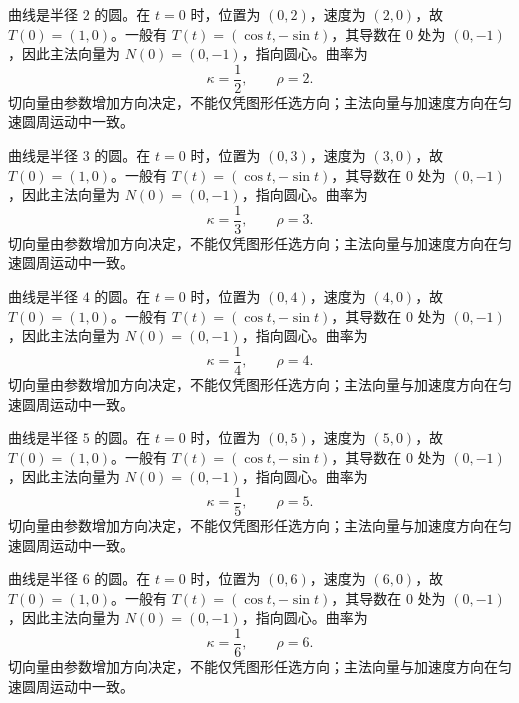 \documentclass[UTF8,12pt,a4paper,fontset=fandol]{ctexart}
\begin{document}
\begin{solve}\label{ans:c31q20}
曲线是半径 $2$ 的圆。在 $t=0$ 时，位置为 $(0,2)$，速度为 $(2,0)$，故 $T(0)=(1,0)$。一般有 $T(t)=(\cos t,-\sin t)$，其导数在 $0$ 处为 $(0,-1)$，因此主法向量为 $N(0)=(0,-1)$，指向圆心。曲率为
\[
\kappa=\frac1{2},\qquad\rho=2.
\]
切向量由参数增加方向决定，不能仅凭图形任选方向；主法向量与加速度方向在匀速圆周运动中一致。
\end{solve}

\begin{solve}\label{ans:c31q21}
曲线是半径 $3$ 的圆。在 $t=0$ 时，位置为 $(0,3)$，速度为 $(3,0)$，故 $T(0)=(1,0)$。一般有 $T(t)=(\cos t,-\sin t)$，其导数在 $0$ 处为 $(0,-1)$，因此主法向量为 $N(0)=(0,-1)$，指向圆心。曲率为
\[
\kappa=\frac1{3},\qquad\rho=3.
\]
切向量由参数增加方向决定，不能仅凭图形任选方向；主法向量与加速度方向在匀速圆周运动中一致。
\end{solve}

\begin{solve}\label{ans:c31q22}
曲线是半径 $4$ 的圆。在 $t=0$ 时，位置为 $(0,4)$，速度为 $(4,0)$，故 $T(0)=(1,0)$。一般有 $T(t)=(\cos t,-\sin t)$，其导数在 $0$ 处为 $(0,-1)$，因此主法向量为 $N(0)=(0,-1)$，指向圆心。曲率为
\[
\kappa=\frac1{4},\qquad\rho=4.
\]
切向量由参数增加方向决定，不能仅凭图形任选方向；主法向量与加速度方向在匀速圆周运动中一致。
\end{solve}

\begin{solve}\label{ans:c31q23}
曲线是半径 $5$ 的圆。在 $t=0$ 时，位置为 $(0,5)$，速度为 $(5,0)$，故 $T(0)=(1,0)$。一般有 $T(t)=(\cos t,-\sin t)$，其导数在 $0$ 处为 $(0,-1)$，因此主法向量为 $N(0)=(0,-1)$，指向圆心。曲率为
\[
\kappa=\frac1{5},\qquad\rho=5.
\]
切向量由参数增加方向决定，不能仅凭图形任选方向；主法向量与加速度方向在匀速圆周运动中一致。
\end{solve}

\begin{solve}\label{ans:c31q24}
曲线是半径 $6$ 的圆。在 $t=0$ 时，位置为 $(0,6)$，速度为 $(6,0)$，故 $T(0)=(1,0)$。一般有 $T(t)=(\cos t,-\sin t)$，其导数在 $0$ 处为 $(0,-1)$，因此主法向量为 $N(0)=(0,-1)$，指向圆心。曲率为
\[
\kappa=\frac1{6},\qquad\rho=6.
\]
切向量由参数增加方向决定，不能仅凭图形任选方向；主法向量与加速度方向在匀速圆周运动中一致。
\end{solve}
\end{document}
